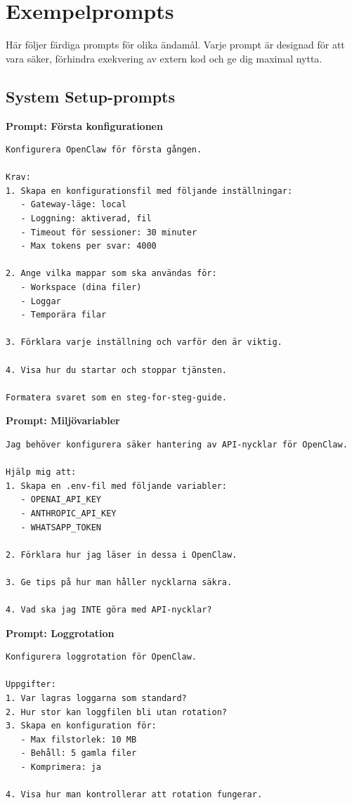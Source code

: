 \documentclass[12pt,a4paper,swedish]{article}
\begin{document}
\section{Exempelprompts}
\label{sec:del5}

Här följer färdiga prompts för olika ändamål. Varje prompt är designad för att vara säker, förhindra exekvering av extern kod och ge dig maximal nytta.

\subsection{System Setup-prompts}
\label{sec:setup-prompts}

\bigskip

\textbf{Prompt: Första konfigurationen}
\begin{lstlisting}[style=latex]
Konfigurera OpenClaw för första gången.

Krav:
1. Skapa en konfigurationsfil med följande inställningar:
   - Gateway-läge: local
   - Loggning: aktiverad, fil
   - Timeout för sessioner: 30 minuter
   - Max tokens per svar: 4000
   
2. Ange vilka mappar som ska användas för:
   - Workspace (dina filer)
   - Loggar
   - Temporära filar
   
3. Förklara varje inställning och varför den är viktig.

4. Visa hur du startar och stoppar tjänsten.

Formatera svaret som en steg-for-steg-guide.
\end{lstlisting}

\bigskip

\textbf{Prompt: Miljövariabler}
\begin{lstlisting}[style=latex]
Jag behöver konfigurera säker hantering av API-nycklar för OpenClaw.

Hjälp mig att:
1. Skapa en .env-fil med följande variabler:
   - OPENAI_API_KEY
   - ANTHROPIC_API_KEY
   - WHATSAPP_TOKEN
   
2. Förklara hur jag läser in dessa i OpenClaw.

3. Ge tips på hur man håller nycklarna säkra.

4. Vad ska jag INTE göra med API-nycklar?
\end{lstlisting}

\bigskip

\textbf{Prompt: Loggrotation}
\begin{lstlisting}[style=latex]
Konfigurera loggrotation för OpenClaw.

Uppgifter:
1. Var lagras loggarna som standard?
2. Hur stor kan loggfilen bli utan rotation?
3. Skapa en konfiguration för:
   - Max filstorlek: 10 MB
   - Behåll: 5 gamla filer
   - Komprimera: ja
   
4. Visa hur man kontrollerar att rotation fungerar.
\end{lstlisting}
\end{document}

